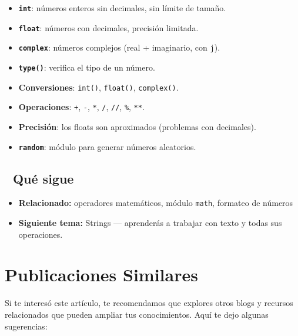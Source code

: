 \documentclass[
  doc,
  floatsintext,
  longtable,
  a4paper,
  nolmodern,
  notxfonts,
  notimes,
  12pt,
  colorlinks=true,linkcolor=blue,citecolor=blue,urlcolor=blue]{apa7}
\providecommand{\tightlist}{%
  \setlength{\itemsep}{0pt}\setlength{\parskip}{0pt}}
\begin{document}
\begin{itemize}
\tightlist
\item
  \textbf{\texttt{int}}: números enteros sin decimales, sin límite de
  tamaño.
\item
  \textbf{\texttt{float}}: números con decimales, precisión limitada.
\item
  \textbf{\texttt{complex}}: números complejos (real + imaginario, con
  \texttt{j}).
\item
  \textbf{\texttt{type()}}: verifica el tipo de un número.
\item
  \textbf{Conversiones}: \texttt{int()}, \texttt{float()},
  \texttt{complex()}.
\item
  \textbf{Operaciones}: \texttt{+}, \texttt{-}, \texttt{*}, \texttt{/},
  \texttt{//}, \texttt{\%}, \texttt{**}.
\item
  \textbf{Precisión}: los floats son aproximados (problemas con
  decimales).
\item
  \textbf{\texttt{random}}: módulo para generar números aleatorios.
\end{itemize}

\subsection{🔗 Qué sigue}\label{quuxe9-sigue}

\begin{itemize}
\tightlist
\item
  \textbf{Relacionado:} operadores matemáticos, módulo \texttt{math},
  formateo de números
\item
  \textbf{Siguiente tema:} Strings --- aprenderás a trabajar con texto y
  todas sus operaciones.
\end{itemize}

\section{Publicaciones Similares}\label{publicaciones-similares}

Si te interesó este artículo, te recomendamos que explores otros blogs y
recursos relacionados que pueden ampliar tus conocimientos. Aquí te dejo
algunas sugerencias:
\end{document}
